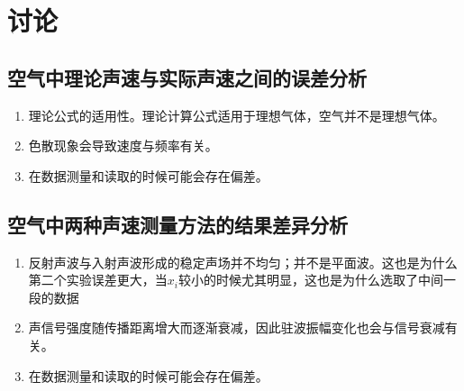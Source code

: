 \documentclass[12pt,a4paper]{ctexart}
\begin{document}
\section{讨论}
\subsection{空气中理论声速与实际声速之间的误差分析}

\begin{enumerate}
\item 理论公式的适用性。理论计算公式适用于理想气体，空气并不是理想气体。
\item 色散现象会导致速度与频率有关。
\item 在数据测量和读取的时候可能会存在偏差。
\end{enumerate}
\subsection{空气中两种声速测量方法的结果差异分析}
\begin{enumerate}
\item 反射声波与入射声波形成的稳定声场并不均匀；并不是平面波。这也是为什么第二个实验误差更大，当$x_i$较小的时候尤其明显，这也是为什么选取了中间一段的数据
\item 声信号强度随传播距离增大而逐渐衰减，因此驻波振幅变化也会与信号衰减有关。
\item 在数据测量和读取的时候可能会存在偏差。
\end{enumerate}

\nocite{jcwlsyjy}

\end{document}

